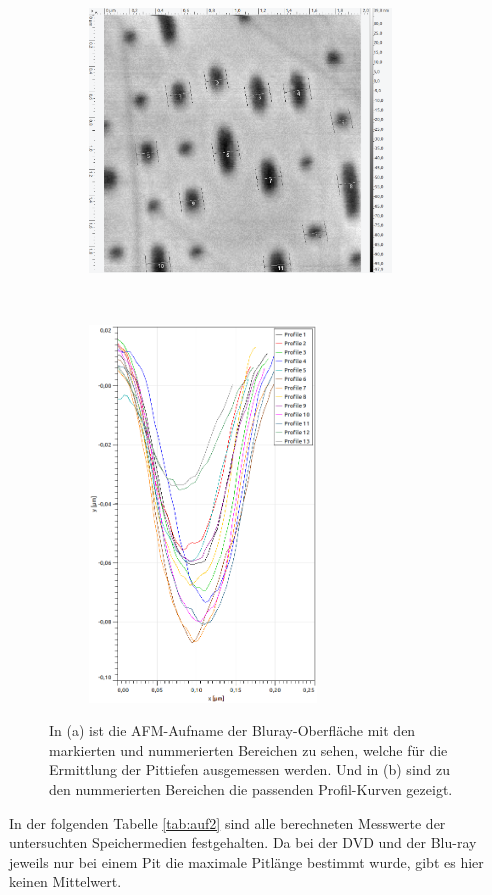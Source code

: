 \begin{figure}[H]
\centering
	\begin{subfigure}[t]{0.45\textwidth}
	\includegraphics[height=7cm]{AFM_auswertung/bluray_tiefe.png}
	\caption{}
	\end{subfigure}
	~
	\begin{subfigure}[t]{0.45\textwidth}
	\includegraphics[height=10cm]{AFM_auswertung/bluray_tiefe_grafik.png}
	\caption{}
	\label{abb:br_tiefe}
	\end{subfigure}
\caption{In (a) ist die AFM-Aufname der Bluray-Oberfl\"ache mit den markierten und nummerierten Bereichen zu sehen, welche f\"ur die Ermittlung der Pittiefen ausgemessen werden. Und in (b) sind zu den nummerierten Bereichen die passenden Profil-Kurven gezeigt.}
\label{abb:pit_tiefe_br}
\end{figure}
In der folgenden Tabelle \ref{tab:auf2} sind alle berechneten Messwerte der untersuchten Speicher{\-}medien festgehalten.
Da bei der DVD und der Blu-ray jeweils nur bei einem Pit die maximale Pitl\"ange bestimmt wurde, gibt es hier keinen Mittelwert.
